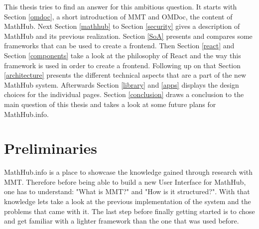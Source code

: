 \documentclass[11pt,a4paper]{article}
\begin{document}
\newline \newline
This thesis tries to find an answer for this ambitious question. It starts with Section \ref{omdoc}, a short introduction of  MMT and OMDoc, the content of MathHub. 
Next Section \ref{mathhub} to Section \ref{security} gives a description of MathHub and its previous realization.
Section \ref{SoA} presents and compares some frameworks that can be used to create a frontend.
Then Section \ref{react} and  Section \ref{components} take a look at the philosophy of React and the way this framework is used in order to create a frontend.
Following up on that Section \ref{architecture} presents the different technical aspects that are a part of the new MathHub system.
Afterwards Section \ref{library} and \ref{apps} displays the design choices for the individual pages.
Section \ref{conclusion} draws a conclusion to the main question of this thesis and takes a look at some future plans for MathHub.info.

\section{Preliminaries} \label{preliminaries}
MathHub.info is a place to showcase the knowledge gained through research with MMT.
Therefore before being able to build a new User Interface for MathHub, one has to understand: "What is MMT?" and "How is it structured?".
With that knowledge lets take a look at the previous implementation of the system and the problems that came with it.
The last step before finally getting started is to chose and get familiar with a lighter framework than the one that was used before.
\end{document}

